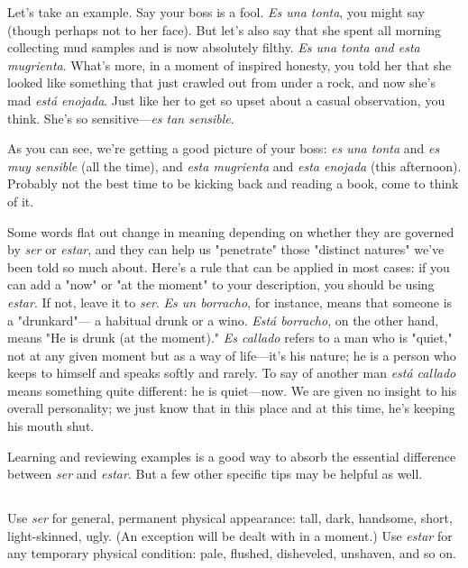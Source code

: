\documentclass[14pt,a4paper,oneside]{memoir}
\begin{document}
Let's take an example. Say your boss is a fool. \emph{Es una tonta},
you might say (though perhaps not to her face). But let's also say that
she spent all morning collecting mud samples and is now absolutely
filthy. \emph{Es una tonta and esta mugrienta}. What's more, in a moment of
inspired honesty, you told her that she looked like something that just
crawled out from under a rock, and now she's mad \emph{está enojada}. Just
like her to get so upset about a casual observation, you think. She's so
sensitive---\emph{es tan sensible}.

As you can see, we're getting a good picture of your boss: \emph{es
	una tonta} and \emph{es muy sensible} (all the time), and \emph{esta mugrienta} and
\emph{esta enojada} (this afternoon). Probably not the best time to be kicking
back and reading a book, come to think of it.

Some words flat out change in meaning depending on whether
they are governed by \emph{ser} or \emph{estar}, and they can help us "penetrate"
those "distinct natures" we've been told so much about. Here's a rule
that can be applied in most cases: if you can add a "now" or "at the moment" to your description, you should be using \emph{estar}. If not, leave it to
\emph{ser}. \emph{Es un borracho}, for instance, means that someone is a "drunkard"---
a habitual drunk or a wino. \emph{Está borracho}, on the other hand, means
"He is drunk (at the moment)." \emph{Es callado} refers to a man who is
"quiet," not at any given moment but as a way of life---it's his nature;
he is a person who keeps to himself and speaks softly and rarely. To say
of another man \emph{está callado} means something quite different: he is
quiet---now. We are given no insight to his overall personality; we just
know that in this place and at this time, he's keeping his mouth shut.

Learning and reviewing examples is a good way to absorb the
essential difference between \emph{ser} and \emph{estar}. But a few other specific tips
may be helpful as well.

\subsection{}

Use \emph{ser} for general, permanent physical appearance: tall,
dark, handsome, short, light-skinned, ugly. (An exception will be dealt
with in a moment.) Use \emph{estar} for any temporary physical condition:
pale, flushed, disheveled, unshaven, and so on.
\end{document}
